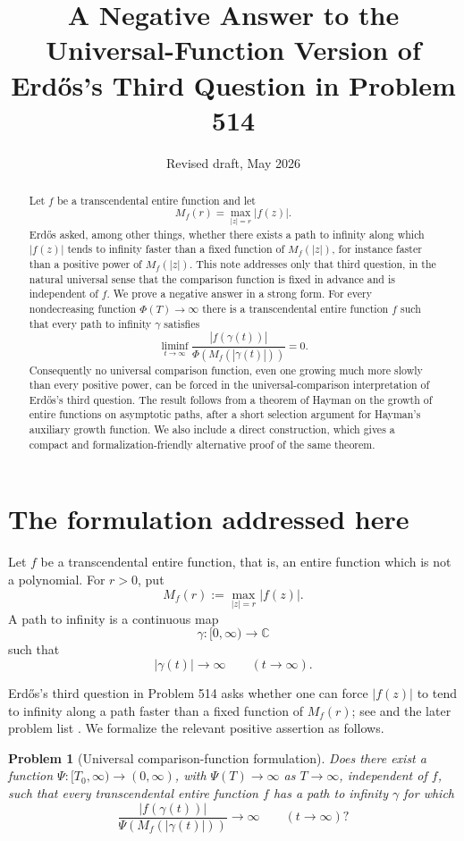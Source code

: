 \documentclass[11pt]{article}
\title{A Negative Answer to the Universal-Function Version of Erd\H{o}s's Third Question in Problem 514}
\author{}
\date{Revised draft, May 2026}
\newtheorem{problem}{Problem}
\newcommand{\C}{\mathbb C}
\begin{document}
\maketitle

\begin{abstract}
Let \(f\) be a transcendental entire function and let
\[
M_f(r)=\max_{|z|=r}|f(z)|.
\]
Erd\H{o}s asked, among other things, whether there exists a path to infinity
along which \(|f(z)|\) tends to infinity faster than a fixed function of
\(M_f(|z|)\), for instance faster than a positive power of \(M_f(|z|)\).
This note addresses only that third question, in the natural universal sense
that the comparison function is fixed in advance and is independent of \(f\).
We prove a negative answer in a strong form.  For every nondecreasing function
\(\Phi(T)\to\infty\) there is a transcendental entire function \(f\) such that
every path to infinity \(\gamma\) satisfies
\[
\liminf_{t\to\infty}
\frac{|f(\gamma(t))|}{\Phi(M_f(|\gamma(t)|))}=0.
\]
Consequently no universal comparison function, even one growing much more
slowly than every positive power, can be forced in the universal-comparison
interpretation of Erd\H{o}s's third question.
The result follows from a theorem of Hayman on the growth of entire functions
on asymptotic paths, after a short selection argument for Hayman's auxiliary
growth function.  We also include a direct construction, which gives a compact
and formalization-friendly alternative proof of the same theorem.
\end{abstract}

\section{The formulation addressed here}

Let \(f\) be a transcendental entire function, that is, an entire function
which is not a polynomial.  For \(r>0\), put
\[
M_f(r):=\max_{|z|=r}|f(z)|.
\]
A path to infinity is a continuous map
\[
\gamma:[0,\infty)\to\C
\]
such that
\[
|\gamma(t)|\to\infty \qquad (t\to\infty).
\]

Erd\H{o}s's third question in Problem 514 asks whether one can force
\(|f(z)|\) to tend to infinity along a path faster than a fixed function of
\(M_f(r)\); see \cite[p. 249]{Erdos1961} and the later problem list
\cite{Erdos1982}.  We formalize the relevant positive assertion as follows.

\begin{problem}[Universal comparison-function formulation]
Does there exist a function \(\Psi:[T_0,\infty)\to(0,\infty)\), with
\(\Psi(T)\to\infty\) as \(T\to\infty\), independent of \(f\), such that every
transcendental entire function \(f\) has a path to infinity \(\gamma\) for which
\[
\frac{|f(\gamma(t))|}{\Psi(M_f(|\gamma(t)|))}\to\infty
\qquad (t\to\infty)?
\]
\end{problem}
\end{document}
